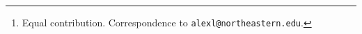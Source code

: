 \author{%
Alexander Loftus\thanks{Equal contribution. Correspondence to \texttt{alexl@northeastern.edu}.} \\
Northeastern University \\
\And
David Bau$^*$ \\
Northeastern University \\
}